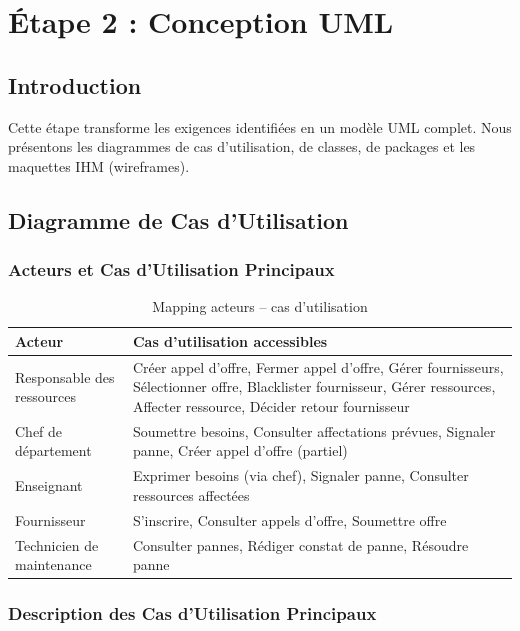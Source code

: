 \chapter{Étape 2 : Conception UML}

\section{Introduction}

Cette étape transforme les exigences identifiées en un modèle UML complet. Nous présentons les diagrammes de cas d'utilisation, de classes, de packages et les maquettes IHM (wireframes).

\section{Diagramme de Cas d'Utilisation}

\subsection{Acteurs et Cas d'Utilisation Principaux}

\begin{table}[h!]
\centering
\begin{tabularx}{\textwidth}{|l|X|}
\hline
\textbf{Acteur} & \textbf{Cas d'utilisation accessibles} \\
\hline
Responsable des ressources &
  Créer appel d'offre, Fermer appel d'offre,
  Gérer fournisseurs, Sélectionner offre,
  Blacklister fournisseur, Gérer ressources,
  Affecter ressource, Décider retour fournisseur \\
\hline
Chef de département &
  Soumettre besoins, Consulter affectations prévues,
  Signaler panne, Créer appel d'offre (partiel) \\
\hline
Enseignant &
  Exprimer besoins (via chef), Signaler panne,
  Consulter ressources affectées \\
\hline
Fournisseur &
  S'inscrire, Consulter appels d'offre,
  Soumettre offre \\
\hline
Technicien de maintenance &
  Consulter pannes, Rédiger constat de panne,
  Résoudre panne \\
\hline
\end{tabularx}
\caption{Mapping acteurs -- cas d'utilisation}
\end{table}

\subsection{Description des Cas d'Utilisation Principaux}

